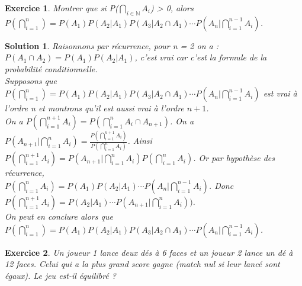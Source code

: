\documentclass[a4paper, 12pt, french]{article}
\theoremstyle{break}
\newtheorem{exer}{Exercice}[section]
\newtheorem{sol}{Solution}[section]
\begin{document}
\begin{exer}
	Montrer que si P($\bigcap_{i \in \mathbb{N}} A_{i}$) > 0, alors $P(\bigcap_{i=1}^{n}) = P(A_{1}) P(A_{2}|A_{1}) P(A_{3}| A_{2} \cap A_{1}) \cdots P(A_{n}|\bigcap_{i=1}^{n-1} A_{i})$.
\end{exer}
\begin{sol}
	Raisonnons par récurrence, pour n = 2 on a :\\
	$P(A_{1} \cap A_{2}) = P(A_{1})P(A_{2}|A_{1})$, c'est vrai car c'est la formule de la probabilité conditionnelle.\\
	Supposons que $P(\bigcap_{i=1}^{n}) = P(A_{1}) P(A_{2}|A_{1}) P(A_{3}| A_{2} \cap A_{1}) \cdots P(A_{n}|\bigcap_{i=1}^{n-1} A_{i})$ est vrai à l'ordre n et montrons qu'il est aussi vrai à l'ordre $n+1$.\\
	On a $P(\bigcap_{i=1}^{n+1} A_{i}) = P(\bigcap_{i=1}^{n}  A_{i} \cap A_{n+1})$. On a $P(A_{n+1}| \bigcap_{i=1}^{n} A_{i})=  \frac{P(\bigcap_{i=1}^{n+1} A_{i})}{P(\bigcap_{i=1}^{n} A_{i})}$. Ainsi $P(\bigcap_{i=1}^{n+1} A_{i}) = P(A_{n+1}| \bigcap_{i=1}^{n} A_{i}) P(\bigcap_{i=1}^{n} A_{i})$. Or par hypothèse des récurrence,\\ $P(\bigcap_{i=1}^{n} A_{i}) = P(A_{1}) P(A_{2} | A_{1}) \cdots P(A_{n}|\bigcap_{i=1}^{n-1} A_{i})$. Donc $P(\bigcap_{i=1}^{n+1} A_{i})  =P(A_{2}|A_{1}) \cdots P(A_{n+1}| \bigcap_{i=1}^{n} A_{i}))$.\\
	On peut en conclure alors que $P(\bigcap_{i=1}^{n}) = P(A_{1}) P(A_{2}|A_{1}) P(A_{3}| A_{2} \cap A_{1}) \cdots P(A_{n}|\bigcap_{i=1}^{n-1} A_{i})$. \marginpar{$\square$}
\end{sol}

\begin{exer}
	Un joueur 1 lance deux dés à 6 faces et un joueur 2 lance un dé à 12 faces. Celui qui a la plus grand score gagne (match nul si leur lancé sont égaux). Le jeu est-il équilibré ?
\end{exer}
\end{document}
